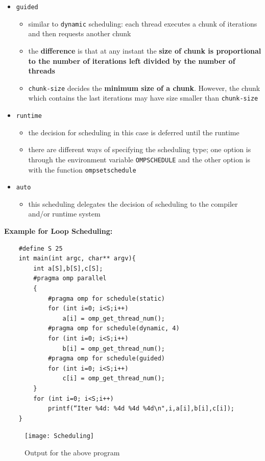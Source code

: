 \documentclass[12pt, a4paper]{report}
\begin{document}
\begin{itemize}
\begin{itemize}
    \end{itemize}
    \item {\texttt{guided}}
    \begin{itemize}
        \item similar to {\texttt{dynamic}} scheduling: each thread executes a chunk of iterations and then requests another chunk
        \item the {\bfseries{difference}} is that at any instant the {\bfseries{size of chunk is proportional to the number of iterations left
              divided by the number of threads}}
        \item {\texttt{chunk-size}} decides the {\bfseries{minimum size of a chunk}}. However, the chunk which contains the last iterations
              may have size smaller than {\texttt{chunk-size}}
    \end{itemize}
    \item {\texttt{runtime}}
    \begin{itemize}
        \item the decision for scheduling in this case is deferred until the runtime
        \item there are different ways of specifying the scheduling type; one option is through the environment variable 
              {\texttt{OMP\textunderscore SCHEDULE}} and the other option is with the function 
              {\texttt{omp\textunderscore set\textunderscore schedule}}
    \end{itemize} 
    \item {\texttt{auto}}
    \begin{itemize}
        \item this scheduling delegates the decision of scheduling to the compiler and/or runtime system
    \end{itemize}
\end{itemize}

{\bfseries{Example for Loop Scheduling:}}
\begin{verbatim}
    #define S 25
    int main(int argc, char** argv){ 
        int a[S],b[S],c[S];
        #pragma omp parallel
        {
            #pragma omp for schedule(static)
            for (int i=0; i<S;i++)
                a[i] = omp_get_thread_num();
            #pragma omp for schedule(dynamic, 4)
            for (int i=0; i<S;i++)
                b[i] = omp_get_thread_num();
            #pragma omp for schedule(guided)
            for (int i=0; i<S;i++)
                c[i] = omp_get_thread_num();
        }
        for (int i=0; i<S;i++)
            printf(“Iter %4d: %4d %4d %4d\n",i,a[i],b[i],c[i]);
    }
\end{verbatim}
\begin{figure}[h]
    \centering
    \texttt{[image: Scheduling]}
    \caption{Output for the above program}
    \label{fig:Scheduling}
\end{figure}
\end{document}
